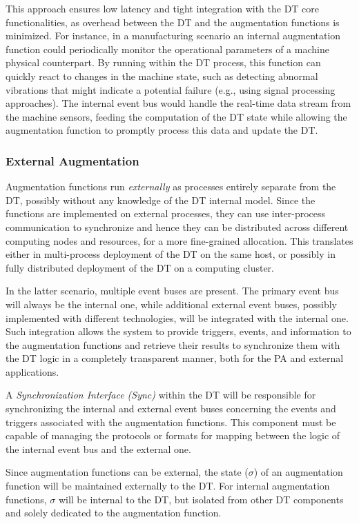 This approach ensures low latency and tight integration with the \ac{DT} core functionalities, as overhead between the \ac{DT} and the augmentation functions is minimized.
%
For instance, in a manufacturing scenario an internal augmentation function could periodically monitor the operational parameters of a machine physical counterpart.
By running within the \ac{DT} process, this function can quickly react to changes in the machine state, such as detecting abnormal vibrations that might indicate a potential failure (e.g., using signal processing approaches).
The internal event bus would handle the real-time data stream from the machine sensors, feeding the computation of the \ac{DT} state while allowing the augmentation function to promptly process this data and update the \ac{DT}.

\subsubsection{External Augmentation}
Augmentation functions run \textit{externally} as processes entirely separate from the \ac{DT}, possibly without any knowledge of the \ac{DT} internal model.
Since the functions are implemented on external processes, they can use inter-process communication to synchronize and hence they can be distributed across different computing nodes and resources, for a more fine-grained allocation.
%
This translates either in multi-process deployment of the \ac{DT} on the same host, or possibly in fully distributed deployment of the \ac{DT} on a computing cluster.

In the latter scenario, multiple event buses are present. The primary event bus will always be the internal one, while additional external event buses, possibly implemented with different technologies, will be integrated with the internal one. Such integration allows the system to provide triggers, events, and information to the augmentation functions and retrieve their results to synchronize them with the \ac{DT} logic in a completely transparent manner, both for the \ac{PA} and external applications.

A \textit{Synchronization Interface (Sync)} within the \ac{DT} will be responsible for synchronizing the internal and external event buses concerning the events and triggers associated with the augmentation functions. This component must be capable of managing the protocols or formats for mapping between the logic of the internal event bus and the external one.

Since augmentation functions can be external, the state (\( \sigma \)) of an augmentation function will be maintained externally to the \ac{DT}. For internal augmentation functions, \( \sigma \) will be internal to the \ac{DT}, but isolated from other \ac{DT} components and solely dedicated to the augmentation function.

